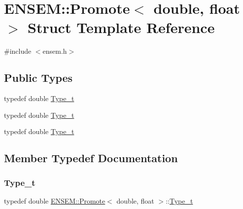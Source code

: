 \hypertarget{structENSEM_1_1Promote_3_01double_00_01float_01_4}{}\section{E\+N\+S\+EM\+:\+:Promote$<$ double, float $>$ Struct Template Reference}
\label{structENSEM_1_1Promote_3_01double_00_01float_01_4}


{\ttfamily \#include $<$ensem.\+h$>$}

\subsection*{Public Types}
\begin{DoxyCompactItemize}
\item 
typedef double \mbox{\hyperlink{structENSEM_1_1Promote_3_01double_00_01float_01_4_a28b4d03d3f730b8dcd68ae2c895ea119}{Type\+\_\+t}}
\item 
typedef double \mbox{\hyperlink{structENSEM_1_1Promote_3_01double_00_01float_01_4_a28b4d03d3f730b8dcd68ae2c895ea119}{Type\+\_\+t}}
\item 
typedef double \mbox{\hyperlink{structENSEM_1_1Promote_3_01double_00_01float_01_4_a28b4d03d3f730b8dcd68ae2c895ea119}{Type\+\_\+t}}
\end{DoxyCompactItemize}


\subsection{Member Typedef Documentation}
\mbox{\label{structENSEM_1_1Promote_3_01double_00_01float_01_4_a28b4d03d3f730b8dcd68ae2c895ea119}} 
\subsubsection{\texorpdfstring{Type\_t}{Type\_t}\hspace{0.1cm}{\footnotesize\ttfamily [1/3]}}
{\footnotesize\ttfamily typedef double \mbox{\hyperlink{structENSEM_1_1Promote}{E\+N\+S\+E\+M\+::\+Promote}}$<$ double, float $>$\+::\mbox{\hyperlink{structENSEM_1_1Promote_3_01double_00_01float_01_4_a28b4d03d3f730b8dcd68ae2c895ea119}{Type\+\_\+t}}}

